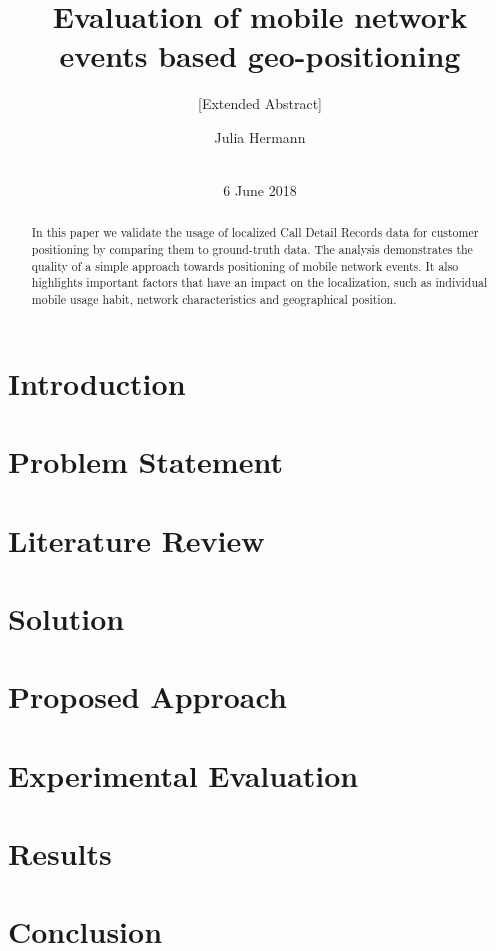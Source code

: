 \documentclass{sig-alternate-05-2015}
\begin{document}
\title{Evaluation of mobile network events based geo-positioning}
\subtitle{[Extended Abstract]}

\author{
\alignauthor
Julia Hermann\\
       \\
}

\maketitle
\date{6 June 2018}
\begin{abstract}
In this paper we validate the usage of localized Call Detail Records data for customer positioning by comparing them to ground-truth data. The analysis demonstrates the quality of a simple approach towards positioning of mobile network events. It also highlights important factors that have an impact on the localization, such as individual mobile usage habit, network characteristics and geographical position.

\end{abstract}
\section{Introduction}
\section{Problem Statement}
\section{Literature Review}
\section{Solution}
\section{Proposed Approach}
\section{Experimental Evaluation}
\section{Results}
\section{Conclusion}



\end{document}

